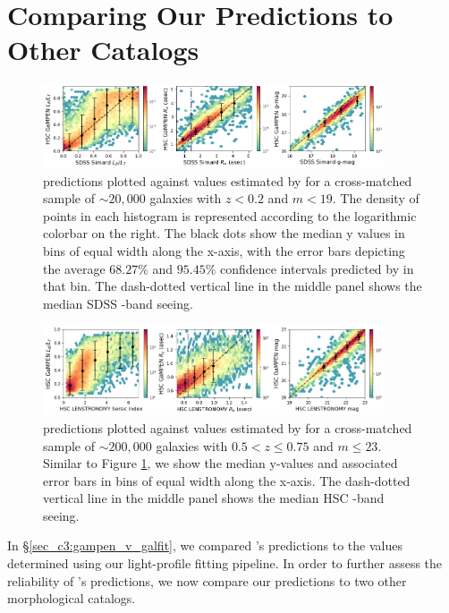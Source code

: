 \section{Comparing Our Predictions to Other Catalogs} \label{sec_c3:compare}

\begin{figure}[htb]
    \centering
    \includegraphics[width = 0.9\textwidth]{gampen_v_simard.png}
    \caption{\gampen{} predictions plotted against values estimated by \citet{simard_11} for a cross-matched sample of $\sim20,000$ galaxies with $z < 0.2$ and $m < 19$. The density of points in each histogram is represented according to the logarithmic colorbar on the right. The black dots show the median y values in bins of equal width along the x-axis, with the error bars depicting the average $68.27\%$ and $95.45\%$ confidence intervals predicted by \gampen{} in that bin. The dash-dotted vertical line in the middle panel shows the median SDSS \gb{}-band seeing.}
    \label{fig_c3:gampen_v_simard}
\end{figure}

\begin{figure}[htb]
    \centering
    \includegraphics[width = 0.9\textwidth]{gampen_v_lenstronomy.png}
    \caption{\gampen{} predictions plotted against values estimated by \citet{hsc_sersic} for a cross-matched sample of $\sim200,000$ galaxies with $0.5 < z \leq 0.75$ and $m \leq 23$. Similar to Figure \ref{fig_c3:gampen_v_simard}, we show the median y-values and associated error bars in bins of equal width along the x-axis. The dash-dotted vertical line in the middle panel shows the median HSC \ib{}-band seeing.}
    \label{fig_c3:gampen_v_lenstronomy}
\end{figure}

In \S \ref{sec_c3:gampen_v_galfit}, we compared \gampen{}'s predictions to the values determined using our light-profile fitting pipeline. In order to further assess the reliability of \gampen{}'s predictions, we now compare our predictions to two other morphological catalogs. 

